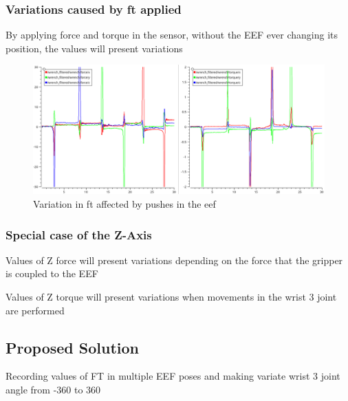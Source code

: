 \subsubsection{Variations caused by \ac{ft} applied}

\par By applying force and torque in the sensor, without the EEF ever changing its position, the values will present variations

\begin{figure}[h]
    \centering
    \includegraphics[width=0.9\linewidth]{figs/chp3/ft_sensor_pushes.png}
    \caption{Variation in \ac{ft} affected by pushes in the \ac{eef}}
    \label{fig:ft_sensor_pushes}
\end{figure}

\subsubsection{Special case of the Z-Axis}

\par Values of Z force will present variations depending on the force that the gripper is coupled to the EEF

\par Values of Z torque will present variations when movements in the wrist 3 joint are performed

\subsection{Proposed Solution}

\par Recording values of FT in multiple EEF poses and making variate wrist 3 joint angle from -360 to 360

